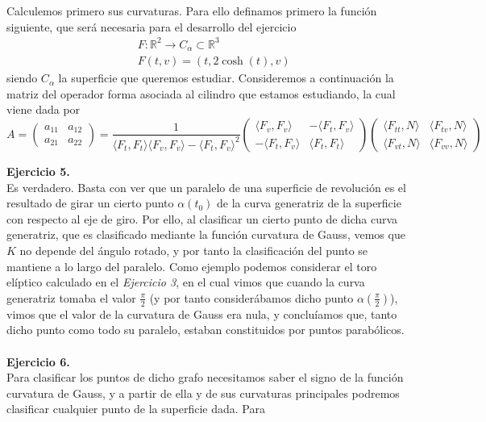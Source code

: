 \documentclass[fleqn]{article}
\def\R{\mathds{R}}
\begin{document}
    Calculemos primero sus curvaturas. Para ello definamos primero la función siguiente, que será necesaria para el desarrollo del ejercicio
    \begin{equation*}
        \begin{aligned}
            & F:\R^2 \rightarrow C_{\alpha} \subset \R^3 \\
            &F(t,v) = (t, 2\cosh(t), v)
        \end{aligned}
    \end{equation*}
    siendo $C_{\alpha}$ la superficie que queremos estudiar. Consideremos a continuación la matriz del operador forma asociada al cilindro que estamos estudiando, la cual viene dada por
    \begin{equation*}
        A =
        \begin{pmatrix}
            a_{11} & a_{12} \\
            a_{21} & a_{22}
        \end{pmatrix}
        = \frac{1}{\langle F_t, F_t \rangle \langle F_v, F_v \rangle - \langle F_t, F_v \rangle ^2}
        \begin{pmatrix}
            \langle F_v, F_v \rangle & - \langle F_t, F_v \rangle \\
            -\langle F_t, F_v \rangle & \langle F_t, F_t \rangle
        \end{pmatrix}
        \begin{pmatrix}
            \langle F_{tt}, N \rangle & \langle F_{tv}, N \rangle \\
            \langle F_{vt}, N \rangle & \langle F_{vv}, N \rangle
        \end{pmatrix}
    \end{equation*}


    \textbf{Ejercicio 5. } \\

    Es verdadero. Basta con ver que un paralelo de una superficie de revolución es el resultado de girar un cierto punto $\alpha(t_0)$ de la curva generatriz de la superficie con respecto
    al eje de giro. Por ello, al clasificar un cierto punto de dicha curva generatriz, que es clasificado mediante la función curvatura de Gauss, vemos que $K$ no depende del ángulo rotado,
    y por tanto la clasificación del punto se mantiene a lo largo del paralelo. Como ejemplo podemos considerar el toro elíptico calculado en el \textit{Ejercicio 3}, en el cual vimos que 
    cuando la curva generatriz tomaba el valor $\frac{\pi}{2}$ (y por tanto considerábamos dicho punto $\alpha(\frac{\pi}{2})$), vimos que el valor de la curvatura de Gauss era nula, y concluíamos
    que, tanto dicho punto como todo su paralelo, estaban constituidos por puntos parabólicos. \\ \\

    \textbf{Ejercicio 6. } \\

    Para clasificar los puntos de dicho grafo necesitamos saber el signo de la función curvatura de Gauss, y a partir de ella y de sus curvaturas principales podremos clasificar cualquier punto
    de la superficie dada. Para 
\end{document}
